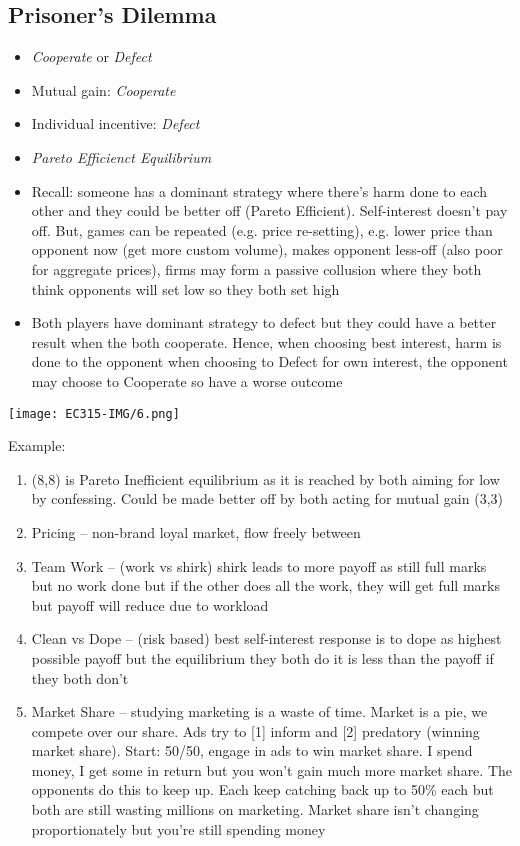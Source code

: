 \documentclass[11pt, english]{article}
\begin{document}
	\newpage

	\subsection{Prisoner's Dilemma}

	\begin{itemize}
	\setlength\itemsep{0cm}
		\item \textit{Cooperate} or \textit{Defect}
		\item Mutual gain: \textit{Cooperate}
		\item Individual incentive: \textit{Defect}
		\item \textit{Pareto Efficienct Equilibrium}
		\item Recall: someone has a dominant strategy where there's harm done to each other and they could be better off (Pareto Efficient). Self-interest doesn't pay off. But, games can be repeated (e.g. price re-setting), e.g. lower price than opponent now (get more custom volume), makes opponent less-off (also poor for aggregate prices), firms may form a passive collusion where they both think opponents will set low so they both set high
		\item Both players have dominant strategy to defect but they could have a better result when the both cooperate. Hence, when choosing best interest, harm is done to the opponent when choosing to Defect for own interest, the opponent may choose to Cooperate so have a worse outcome
	\end{itemize}

	\begin{center}
		\texttt{[image: EC315-IMG/6.png]}
	\end{center}

	Example:

	\begin{enumerate}
	\setlength\itemsep{0cm}
		\item (8,8) is Pareto Inefficient equilibrium as it is reached by both aiming for low by confessing. Could be made better off by both acting for mutual gain (3,3)
		\item Pricing – non-brand loyal market, flow freely between

		\item Team Work – (work vs shirk) shirk leads to more payoff as still full marks but no work done but if the other does all the work, they will get full marks but payoff will reduce due to workload
		\item Clean vs Dope – (risk based) best self-interest response is to dope as highest possible payoff but the equilibrium they both do it is less than the payoff if they both don't
		\item Market Share – studying marketing is a waste of time. Market is a pie, we compete over our share. Ads try to [1] inform and [2] predatory (winning market share). Start: 50/50, engage in ads to win market share. I spend money, I get some in return but you won't gain much more market share. The opponents do this to keep up. Each keep catching back up to 50\% each but both are still wasting millions on marketing. Market share isn't changing proportionately but you're still spending money
	\end{enumerate}
\end{document}
